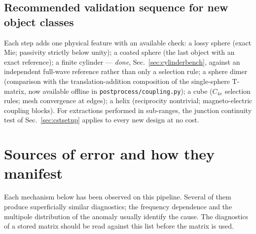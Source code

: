 \documentclass[11pt]{article}
\begin{document}
\subsection{Recommended validation sequence for new object classes}
Each step adds one physical feature with an available check: a lossy
sphere (exact Mie; passivity strictly below unity); a coated sphere (the
last object with an exact reference); a finite cylinder --- \emph{done},
Sec.~\ref{sec:cylinderbench}, against an independent full-wave reference
rather than only a selection rule; a sphere dimer (comparison with the
translation-addition composition of the single-sphere T-matrix, now
available offline in \texttt{postprocess/coupling.py}); a cube
($C_{4v}$ selection rules; mesh convergence at edges); a helix
(reciprocity nontrivial; magneto-electric coupling blocks).  For
extractions performed in sub-ranges, the junction continuity test of
Sec.~\ref{sec:cstsetup} applies to every new design at no cost.

\section{Sources of error and how they manifest}
\label{sec:failuremodes}
Each mechanism below has been observed on this pipeline.  Several of
them produce superficially similar diagnostics; the frequency
dependence and the multipole distribution of the anomaly usually
identify the cause.  The diagnostics of a stored matrix should be read
against this list before the matrix is used.
\end{document}
